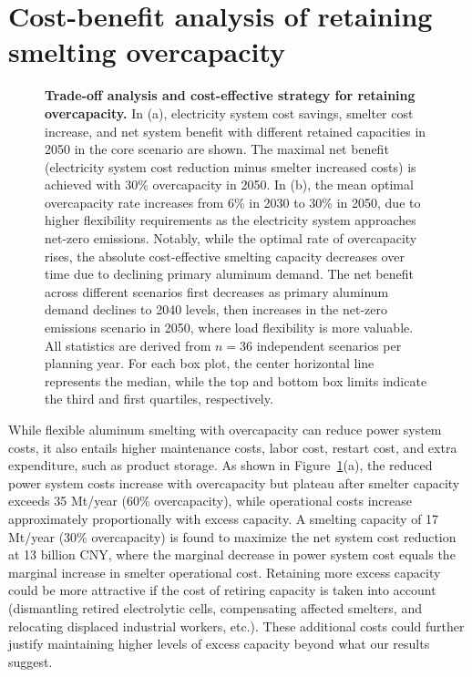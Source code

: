 \documentclass[preprint]{elsarticle}
\begin{document}
\section*{\textbf{Cost-benefit analysis of retaining smelting overcapacity}}

\begin{figure}[H]
  \centering
  \caption{\textbf{Trade-off analysis and cost-effective strategy for retaining overcapacity.} In (a), electricity system cost savings, smelter cost increase, and net system benefit with different retained capacities in 2050 in the core scenario are shown. The maximal net benefit (electricity system cost reduction minus smelter increased costs) is achieved with 30\% overcapacity in 2050. In (b), the mean optimal overcapacity rate increases from 6\% in 2030 to 30\% in 2050, due to higher flexibility requirements as the electricity system approaches net-zero emissions. 
  Notably, while the optimal rate of overcapacity rises, the absolute cost-effective smelting capacity decreases over time due to declining primary aluminum demand. The net benefit across different scenarios first decreases as primary aluminum demand declines to 2040 levels, then increases in the net-zero emissions scenario in 2050, where load flexibility is more valuable.
  All statistics are derived from $n = 36$ independent scenarios per planning year. For each box plot, the center horizontal line represents the median, while the top and bottom box limits indicate the third and first quartiles, respectively.}
  \label{fig_tradeoff_optimal}
\end{figure}

While flexible aluminum smelting with overcapacity can reduce power system costs, it also entails higher maintenance costs, labor cost, restart cost, and extra expenditure, such as product storage. As shown in Figure~\ref{fig_tradeoff_optimal}(a), the reduced power system costs increase with overcapacity but plateau after smelter capacity exceeds 35 Mt/year (60\% overcapacity), while operational costs increase approximately proportionally with excess capacity. A smelting capacity of 17 Mt/year (30\% overcapacity) is found to maximize the net system cost reduction at 13 billion CNY, where the marginal decrease in power system cost equals the marginal increase in smelter operational cost. Retaining more excess capacity could be more attractive if the cost of retiring capacity is taken into account (dismantling retired electrolytic cells, compensating affected smelters, and relocating displaced industrial workers, etc.). These additional costs could further justify maintaining higher levels of excess capacity beyond what our results suggest.
\end{document}
